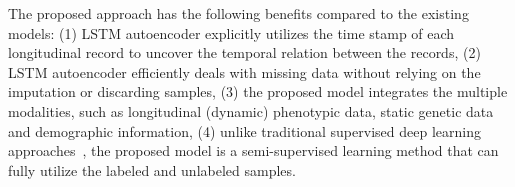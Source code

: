 The proposed approach has the following benefits compared to the existing models:
(1) LSTM autoencoder explicitly utilizes the time stamp of each longitudinal record to uncover the temporal relation between the records,
(2) LSTM autoencoder efficiently deals with missing data without relying on the imputation or discarding samples,
(3) the proposed model integrates the multiple modalities, such as longitudinal (dynamic) phenotypic data, static genetic data and demographic information,
(4) unlike traditional supervised deep learning approaches~\cite{vieira2017using}, the proposed model is a semi-supervised learning method that can fully utilize the labeled and unlabeled samples.

